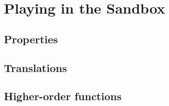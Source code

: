 \section{Playing in the Sandbox}

\subsection{Properties}

\subsection{Translations}

\subsection{Higher-order functions}
